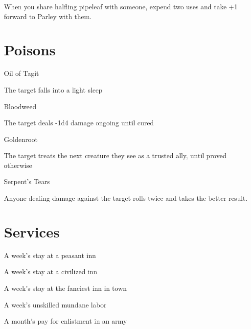 When you share halfling pipeleaf with someone, expend two uses and take +1 forward to Parley with them.

       
\section{Poisons}   
       

Oil of Tagit	 

       

The target falls into a light sleep

       

Bloodweed	 

       

The target deals -1d4 damage ongoing until cured

       

Goldenroot	 

       

The target treats the next creature they see as a trusted ally, until proved otherwise

       

Serpent's Tears	 

       

Anyone dealing damage against the target rolls twice and takes the better result.

       
\section{Services}   
       

A week's stay at a peasant inn	 

       

A week's stay at a civilized inn	 

       

A week's stay at the fanciest inn in town	 

       

A week's unskilled mundane labor	 

       

A month's pay for enlistment in an army	 

       

